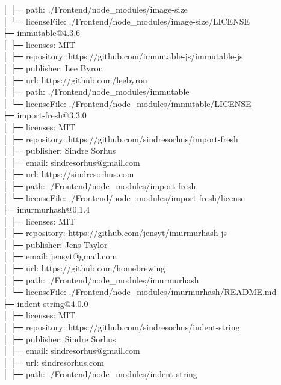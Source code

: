 │  ├─ path: ./Frontend/node\_modules/image-size\\
│  └─ licenseFile: ./Frontend/node\_modules/image-size/LICENSE\\
├─ immutable@4.3.6\\
│  ├─ licenses: MIT\\
│  ├─ repository: https://github.com/immutable-js/immutable-js\\
│  ├─ publisher: Lee Byron\\
│  ├─ url: https://github.com/leebyron\\
│  ├─ path: ./Frontend/node\_modules/immutable\\
│  └─ licenseFile: ./Frontend/node\_modules/immutable/LICENSE\\
├─ import-fresh@3.3.0\\
│  ├─ licenses: MIT\\
│  ├─ repository: https://github.com/sindresorhus/import-fresh\\
│  ├─ publisher: Sindre Sorhus\\
│  ├─ email: sindresorhus@gmail.com\\
│  ├─ url: https://sindresorhus.com\\
│  ├─ path: ./Frontend/node\_modules/import-fresh\\
│  └─ licenseFile: ./Frontend/node\_modules/import-fresh/license\\
├─ imurmurhash@0.1.4\\
│  ├─ licenses: MIT\\
│  ├─ repository: https://github.com/jensyt/imurmurhash-js\\
│  ├─ publisher: Jens Taylor\\
│  ├─ email: jensyt@gmail.com\\
│  ├─ url: https://github.com/homebrewing\\
│  ├─ path: ./Frontend/node\_modules/imurmurhash\\
│  └─ licenseFile: ./Frontend/node\_modules/imurmurhash/README.md\\
├─ indent-string@4.0.0\\
│  ├─ licenses: MIT\\
│  ├─ repository: https://github.com/sindresorhus/indent-string\\
│  ├─ publisher: Sindre Sorhus\\
│  ├─ email: sindresorhus@gmail.com\\
│  ├─ url: sindresorhus.com\\
│  ├─ path: ./Frontend/node\_modules/indent-string\\
